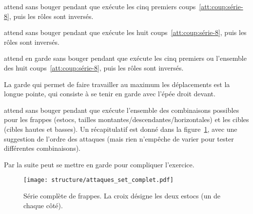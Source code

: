\begin{exercice}


\D attend sans bouger pendant que \A exécute les cinq premiers coups~\ref{att:coup:série-8}, puis les rôles sont inversés.

\end{exercice}


\begin{exercice}


\D attend sans bouger pendant que \A exécute les huit coups~\ref{att:coup:série-8}, puis les rôles sont inversés.

\end{exercice}


\begin{exercice}


\D attend en garde sans bouger pendant que \A exécute les cinq premiers ou l'ensemble des huit coups~\ref{att:coup:série-8}, puis les rôles sont inversés.

La garde qui permet de faire travailler au maximum les déplacements est la longue pointe, qui consiste à se tenir en garde avec l'épée droit devant.

\end{exercice}


\begin{exercice}


\D attend sans bouger pendant que \A exécute l'ensemble des combinaisons possibles pour les frappes (estocs, tailles montantes/descendantes/horizontales) et les cibles (cibles hautes et basses).
Un récapitulatif est donné dans la figure~\ref{att:fig:série-complète}, avec une suggestion de l'ordre des attaques (mais rien n'empêche de varier pour tester différentes combinaisons).

Par la suite \D peut se mettre en garde pour compliquer l'exercice.
\end{exercice}


\begin{figure}[ht]
	\centering
	\texttt{[image: structure/attaques\_set\_complet.pdf]}
	\caption{Série complète de frappes.
	La croix désigne les deux estocs (un de chaque côté).}
	\label{att:fig:série-complète}
\end{figure}


